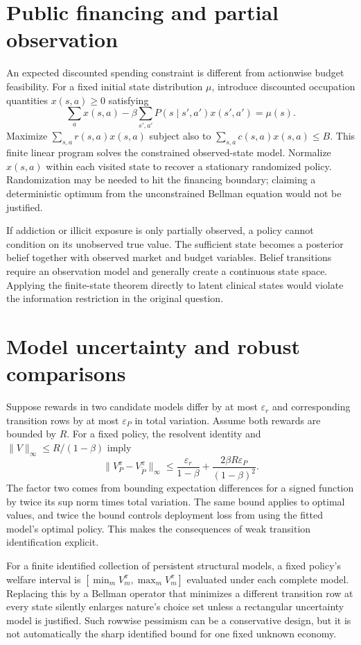 \documentclass[11pt]{article}
\begin{document}
\section*{Public financing and partial observation}
An expected discounted spending constraint is different from actionwise budget feasibility. For a fixed initial state distribution $\mu$, introduce discounted occupation quantities $x(s,a)\geq0$ satisfying
\[
 \sum_a x(s,a)-\beta\sum_{s',a'}P(s\mid s',a')x(s',a')=\mu(s).
\]
Maximize $\sum_{s,a}r(s,a)x(s,a)$ subject also to
$\sum_{s,a}c(s,a)x(s,a)\leq B$.
This finite linear program solves the constrained observed-state model. Normalize $x(s,a)$ within each visited state to recover a stationary randomized policy. Randomization may be needed to hit the financing boundary; claiming a deterministic optimum from the unconstrained Bellman equation would not be justified.

If addiction or illicit exposure is only partially observed, a policy cannot condition on its unobserved true value. The sufficient state becomes a posterior belief together with observed market and budget variables. Belief transitions require an observation model and generally create a continuous state space. Applying the finite-state theorem directly to latent clinical states would violate the information restriction in the original question.

\section*{Model uncertainty and robust comparisons}
Suppose rewards in two candidate models differ by at most $\varepsilon_r$ and corresponding transition rows by at most $\varepsilon_P$ in total variation. Assume both rewards are bounded by $R$. For a fixed policy, the resolvent identity and $\|V\|_\infty\leq R/(1-\beta)$ imply
\[
 \|V_P^\pi-V_{\widetilde P}^\pi\|_\infty
 \leq\frac{\varepsilon_r}{1-\beta}
       +\frac{2\beta R\varepsilon_P}{(1-\beta)^2}.
\]
The factor two comes from bounding expectation differences for a signed function by twice its sup norm times total variation. The same bound applies to optimal values, and twice the bound controls deployment loss from using the fitted model's optimal policy. This makes the consequences of weak transition identification explicit.

For a finite identified collection of persistent structural models, a fixed policy's welfare interval is $[\min_m V_m^\pi,\max_m V_m^\pi]$ evaluated under each complete model. Replacing this by a Bellman operator that minimizes a different transition row at every state silently enlarges nature's choice set unless a rectangular uncertainty model is justified. Such rowwise pessimism can be a conservative design, but it is not automatically the sharp identified bound for one fixed unknown economy.
\end{document}
